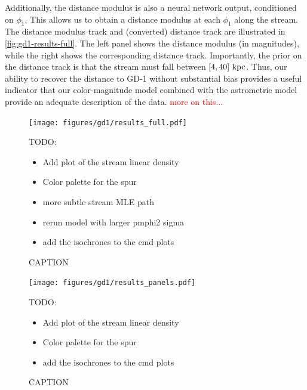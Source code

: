 \documentclass[twocolumn]{aastex631}
\newcommand{\TODO}[1]{{\textcolor{red}{#1}}}
\newcommand{\JN}[1]{\TODO{#1}}
\begin{document}
        Additionally, the distance modulus is also a neural network output,
        conditioned on $\phi_1$. This allows us to obtain a distance modulus at
        each $\phi_1$ along the stream. The distance modulus track and
        (converted) distance track are illustrated in
        \autoref{fig:gd1-results-full}. The left panel shows the distance
        modulus (in magnitudes), while the right shows the corresponding
        distance track. Importantly, the prior on the distance track is that the
        stream must fall between $[4,40]~\rm{kpc}$. Thus, our ability to recover
        the distance to GD-1 without substantial bias provides a useful
        indicator that our color-magnitude model combined with the astrometric
        model provide an adequate description of the data. \JN{more on this...}

        \begin{figure}[h]
            \centering
            \texttt{[image: figures/gd1/results\_full.pdf]}
            \caption{CAPTION}
            TODO:
            \begin{itemize}
                \item Add plot of the stream linear density
                \item Color palette for the spur
                \item more subtle stream MLE path
                \item rerun model with larger pmphi2 sigma
                \item add the isochrones to the cmd plots
            \end{itemize}
            \label{fig:gd1-results-full}
        \end{figure}

        \begin{figure}[h]
            \centering
            \texttt{[image: figures/gd1/results\_panels.pdf]}
            \caption{CAPTION}
            TODO:
            \begin{itemize}
                \item Add plot of the stream linear density
                \item Color palette for the spur
                \item add the isochrones to the cmd plots
            \end{itemize}
            \label{fig:gd1-results-panels}
        \end{figure}
\end{document}

